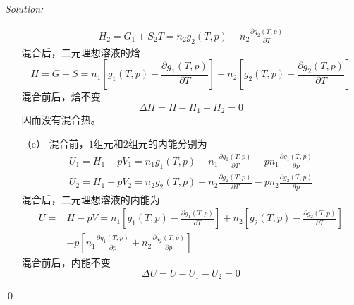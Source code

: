 \documentclass[12pt,a4paper]{article}
\newenvironment{sol}
    {\emph{Solution:}
    }
    {
    \qed
    }
\begin{document}
\begin{sol}
\begin{itemize}
\begin{gather}
H_2=G_1+S_2T=n_2g_2(T,p)-n_2\frac{\partial g_2(T,p)}{\partial T}
\end{gather}
混合后，二元理想溶液的焓
\begin{equation}
H=G+S=n_1\left[g_1(T,p)-\frac{\partial g_1(T,p)}{\partial T}\right]+n_2\left[g_2(T,p)-\frac{\partial g_2(T,p)}{\partial T}\right]
\end{equation}
混合前后，焓不变
\begin{equation}
\Delta H=H-H_1-H_2=0
\end{equation}
因而没有混合热。
\item[（e）] 混合前，$1$组元和$2$组元的内能分别为
\begin{gather}
U_1=H_1-pV_1=n_1g_1(T,p)-n_1\frac{\partial g_1(T,p)}{\partial T}-pn_1\frac{\partial g_1(T,p)}{\partial p}\\
U_2=H_1-pV_2=n_2g_2(T,p)-n_2\frac{\partial g_2(T,p)}{\partial T}-pn_2\frac{\partial g_2(T,p)}{\partial p}
\end{gather}
混合后，二元理想溶液的内能为
\begin{align}
\nonumber U=&H-pV=n_1\left[g_1(T,p)-\frac{\partial g_1(T,p)}{\partial T}\right]+n_2\left[g_2(T,p)-\frac{\partial g_2(T,p)}{\partial T}\right]\\
&-p\left[n_1\frac{\partial g_1(T,p)}{\partial p}+n_2\frac{\partial g_2(T,p)}{\partial p}\right]
\end{align}
混合前后，内能不变
\begin{equation}
\Delta U=U-U_1-U_2=0
\end{equation}
\end{itemize}
\end{sol}
\end{document}

